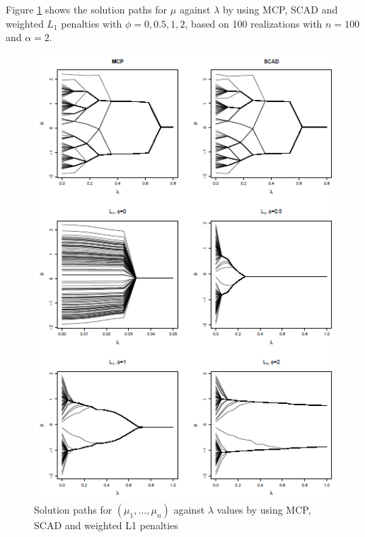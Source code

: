 \documentclass[review]{elsarticle}
\begin{document}
Figure \ref{fig:1} shows the solution paths for $\mu$ against $\lambda$ by using MCP, SCAD and weighted $L_1$ penalties with $\phi=0,0.5,1,2$, based on 100 realizations with $n=100$ and $\alpha=2$. 
\begin{figure}[H]
\caption{Solution paths for $(\mu_1,...,\mu_n)$ against $\lambda$ values by using MCP, SCAD and weighted L1 penalties}
\label{fig:1}
\centering
\includegraphics[width=.8\textwidth]{solution_path.png}
\end{figure}
\end{document}
